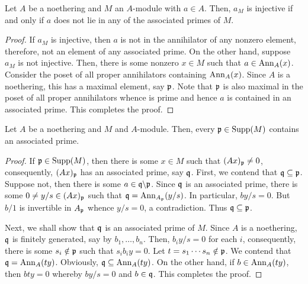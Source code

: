 \begin{lemma}
    Let $A$ be a noethering and $M$ an $A$-module with $a\in A$. Then, $a_M$ is injective if and only if $a$ does not lie in any of the associated primes of $M$.
\end{lemma}
\begin{proof}
    If $a_M$ is injective, then $a$ is not in the annihilator of any nonzero element, therefore, not an element of any associated prime. On the other hand, suppose $a_M$ is not injective. Then, there is some nonzero $x\in M$ such that $a\in\operatorname{Ann}_A(x)$. Consider the poset of all proper annihilators containing $\operatorname{Ann}_A(x)$. Since $A$ is a noethering, this has a maximal element, say $\mathfrak p$. Note that $\mathfrak p$ is also maximal in the poset of all proper annihilators whence is prime and hence $a$ is contained in an associated prime. This completes the proof.
\end{proof}

\begin{lemma}
    Let $A$ be a noethering and $M$ and $A$-module. Then, every $\mathfrak p\in\operatorname{Supp}(M)$ contains an associated prime.
\end{lemma}
\begin{proof}
    If $\mathfrak p\in\operatorname{Supp}(M)$, then there is some $x\in M$ such that $(Ax)_\mathfrak p\ne0$, consequently, $(Ax)_\mathfrak p$ has an associated prime, say $\mathfrak q$. First, we contend that $\mathfrak q\subseteq\mathfrak p$. Suppose not, then there is some $a\in\mathfrak q\backslash\mathfrak p$. Since $\mathfrak q$ is an associated prime, there is some $0\ne y/s\in (Ax)_\mathfrak p$ such that $\mathfrak q = \operatorname{Ann}_{A_\mathfrak p}(y/s)$. In particular, $by/s = 0$. But $b/1$ is invertible in $A_\mathfrak p$ whence $y/s = 0$, a contradiction. Thus $\mathfrak q\subseteq\mathfrak p$.

    Next, we shall show that $\mathfrak q$ is an associated prime of $M$. Since $A$ is a noethering, $\mathfrak q$ is finitely generated, say by $b_1,\dots,b_n$. Then, $b_iy/s = 0$ for each $i$, consequently, there is some $s_i\notin\mathfrak p$ such that $s_ib_iy = 0$. Let $t = s_1\cdots s_n\notin\mathfrak p$. We contend that $\mathfrak q = \operatorname{Ann}_A(ty)$. Obviously, $\mathfrak q\subseteq\operatorname{Ann}_A(ty)$. On the other hand, if $b\in\operatorname{Ann}_A(ty)$, then $bty = 0$ whereby $by/s = 0$ and $b\in\mathfrak q$. This completes the proof.
\end{proof}

